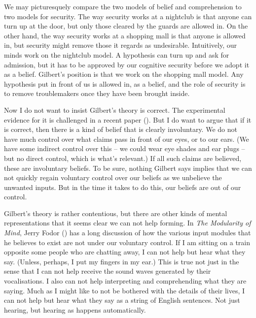\documentclass[
  11pt,
  letterpaper,
  DIV=11,
  numbers=noendperiod,
  oneside]{scrartcl}
\begin{document}
We may picturesquely compare the two models of belief and comprehension
to two models for security. The way security works at a nightclub is
that anyone can turn up at the door, but only those cleared by the
guards are allowed in. On the other hand, the way security works at a
shopping mall is that anyone is allowed in, but security might remove
those it regards as undesirable. Intuitively, our minds work on the
nightclub model. A hypothesis can turn up and ask for admission, but it
has to be approved by our cognitive security before we adopt it as a
belief. Gilbert's position is that we work on the shopping mall model.
Any hypothesis put in front of us is allowed in, as a belief, and the
role of security is to remove troublemakers once they have been brought
inside.

Now I do not want to insist Gilbert's theory is correct. The
experimental evidence for it is challenged in a recent paper
(). But I do want to argue that if it is correct, then there is a
kind of belief that is clearly involuntary. We do not have much control
over what claims pass in front of our eyes, or to our ears. (We have
some indirect control over this -- we could wear eye shades and ear
plugs -- but no direct control, which is what's relevant.) If all such
claims are believed, these are involuntary beliefs. To be sure, nothing
Gilbert says implies that we can not quickly regain voluntary control
over our beliefs as we unbelieve the unwanted inputs. But in the time it
takes to do this, our beliefs are out of our control.

Gilbert's theory is rather contentious, but there are other kinds of
mental representations that it seems clear we can not help forming. In
\emph{The Modularity of Mind}, Jerry Fodor
() has a long discussion of how the
various input modules that he believes to exist are not under our
voluntary control.
If I am sitting on a train opposite some people who are chatting away, I
can not help but hear what they say. (Unless, perhaps, I put my fingers
in my ear.) This is true not just in the sense that I can not help
receive the sound waves generated by their vocalisations. I also can not
help interpreting and comprehending what they are saying. Much as I
might like to not be bothered with the details of their lives, I can not
help but hear what they say as a string of English sentences. Not just
hearing, but hearing as happens automatically.
\end{document}
